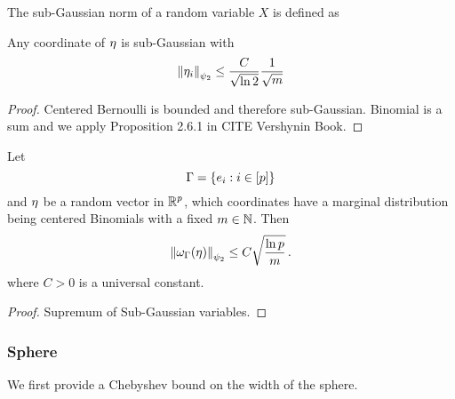 \begin{definition}
	The sub-Gaussian norm of a random variable $X$ is defined as
\end{definition}

\begin{theorem}
	Any coordinate of $\eta$ is sub-Gaussian with 
		\[ \left\|\eta_i\right\|_{\psi_2} \leq \frac{C}{\sqrt{\ln2}} \frac{1}{\sqrt{m}} \]
\end{theorem}
\begin{proof}
	Centered Bernoulli is bounded and therefore sub-Gaussian.
	Binomial is a sum and we apply Proposition 2.6.1 in CITE Vershynin Book.
\end{proof}


\begin{theorem}\label{the:basisTensorWidthBound}
	Let 
		\[ \Gamma = \{e_{i} : i \in [p] \}\]
	and $\eta$ be a random vector in $\mathbb{R}^p$, which coordinates have a marginal distribution being centered Binomials with a fixed $m\in\mathbb{N}$.
	Then
		\[ \left\|\omega_{\Gamma}(\eta)\right\|_{\psi_2} \leq C \sqrt{\frac{\ln p}{m}} \, . \]
	where $C>0$ is a universal constant.
\end{theorem}
\begin{proof}
	Supremum of Sub-Gaussian variables.
\end{proof}


\subsubsection{Sphere}

We first provide a Chebyshev bound on the width of the sphere.

